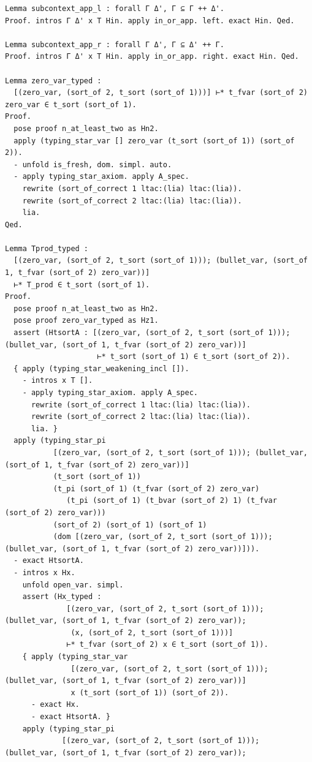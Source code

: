 \begin{latin}
\begin{verbatim}
Lemma subcontext_app_l : forall Γ Δ', Γ ⊆ Γ ++ Δ'.
Proof. intros Γ Δ' x T Hin. apply in_or_app. left. exact Hin. Qed.

Lemma subcontext_app_r : forall Γ Δ', Γ ⊆ Δ' ++ Γ.
Proof. intros Γ Δ' x T Hin. apply in_or_app. right. exact Hin. Qed.

Lemma zero_var_typed :
  [(zero_var, (sort_of 2, t_sort (sort_of 1)))] ⊢* t_fvar (sort_of 2) zero_var ∈ t_sort (sort_of 1).
Proof.
  pose proof n_at_least_two as Hn2.
  apply (typing_star_var [] zero_var (t_sort (sort_of 1)) (sort_of 2)).
  - unfold is_fresh, dom. simpl. auto.
  - apply typing_star_axiom. apply A_spec.
    rewrite (sort_of_correct 1 ltac:(lia) ltac:(lia)).
    rewrite (sort_of_correct 2 ltac:(lia) ltac:(lia)).
    lia.
Qed.

Lemma Tprod_typed :
  [(zero_var, (sort_of 2, t_sort (sort_of 1))); (bullet_var, (sort_of 1, t_fvar (sort_of 2) zero_var))]
  ⊢* T_prod ∈ t_sort (sort_of 1).
Proof.
  pose proof n_at_least_two as Hn2.
  pose proof zero_var_typed as Hz1.
  assert (HtsortA : [(zero_var, (sort_of 2, t_sort (sort_of 1))); (bullet_var, (sort_of 1, t_fvar (sort_of 2) zero_var))]
                     ⊢* t_sort (sort_of 1) ∈ t_sort (sort_of 2)).
  { apply (typing_star_weakening_incl []).
    - intros x T [].
    - apply typing_star_axiom. apply A_spec.
      rewrite (sort_of_correct 1 ltac:(lia) ltac:(lia)).
      rewrite (sort_of_correct 2 ltac:(lia) ltac:(lia)).
      lia. }
  apply (typing_star_pi
           [(zero_var, (sort_of 2, t_sort (sort_of 1))); (bullet_var, (sort_of 1, t_fvar (sort_of 2) zero_var))]
           (t_sort (sort_of 1))
           (t_pi (sort_of 1) (t_fvar (sort_of 2) zero_var)
              (t_pi (sort_of 1) (t_bvar (sort_of 2) 1) (t_fvar (sort_of 2) zero_var)))
           (sort_of 2) (sort_of 1) (sort_of 1)
           (dom [(zero_var, (sort_of 2, t_sort (sort_of 1))); (bullet_var, (sort_of 1, t_fvar (sort_of 2) zero_var))])).
  - exact HtsortA.
  - intros x Hx.
    unfold open_var. simpl.
    assert (Hx_typed :
              [(zero_var, (sort_of 2, t_sort (sort_of 1))); (bullet_var, (sort_of 1, t_fvar (sort_of 2) zero_var));
               (x, (sort_of 2, t_sort (sort_of 1)))]
              ⊢* t_fvar (sort_of 2) x ∈ t_sort (sort_of 1)).
    { apply (typing_star_var
               [(zero_var, (sort_of 2, t_sort (sort_of 1))); (bullet_var, (sort_of 1, t_fvar (sort_of 2) zero_var))]
               x (t_sort (sort_of 1)) (sort_of 2)).
      - exact Hx.
      - exact HtsortA. }
    apply (typing_star_pi
             [(zero_var, (sort_of 2, t_sort (sort_of 1))); (bullet_var, (sort_of 1, t_fvar (sort_of 2) zero_var));

\end{verbatim}
\end{latin}
